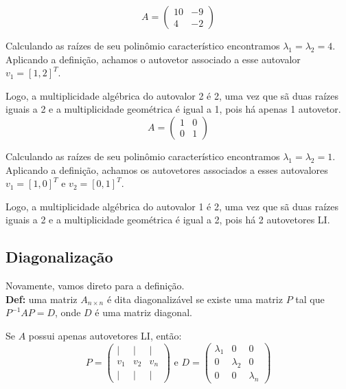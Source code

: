 \documentclass[12pt]{article}
\begin{document}
	\begin{equation*}
		A=\begin{pmatrix}
			10 & -9 \\
			4 & -2
		\end{pmatrix}	
	\end{equation*}
	
	Calculando as raízes de seu polinômio característico encontramos $\lambda_1=\lambda_2=4$. Aplicando a definição, achamos o autovetor associado a esse autovalor $v_1=[1,2]^T$. 
	
	Logo, a multiplicidade algébrica do autovalor 2 é 2, uma vez que sã duas raízes iguais a 2 e a multiplicidade geométrica é igual a 1, pois há apenas 1 autovetor.\\
	
	\begin{equation*}
		A=\begin{pmatrix}
			1 & 0 \\
			0 & 1
		\end{pmatrix}	
	\end{equation*}
	
	Calculando as raízes de seu polinômio característico encontramos $\lambda_1=\lambda_2=1$. Aplicando a definição, achamos os autovetores associados a esses autovalores $v_1=[1,0]^T$ e $v_2=[0,1]^T$. 
	
	Logo, a multiplicidade algébrica do autovalor 1 é 2, uma vez que sã duas raízes iguais a 2 e a multiplicidade geométrica é igual a 2, pois há 2 autovetores LI.
	
	\subsection{Diagonalização}
	
	Novamente, vamos direto para a definição.\\
	
	\textbf{Def:} uma matriz $A_{n\times n}$ é dita diagonalizável se existe uma matriz $P$ tal que $P^{-1}AP=D$, onde $D$ é uma matriz diagonal.
	
	Se $A$ possui apenas autovetores LI, então:
	\begin{equation*}
		P=\begin{pmatrix}
			| & | & |\\
			v_1 & v_2 & v_n\\
			| & | & |
		\end{pmatrix} \mbox{ e }
		D=\begin{pmatrix}
			\lambda_1 & 0 & 0 \\
			0 & \lambda_2 & 0 \\
			0 & 0 & \lambda_n
		\end{pmatrix}
	\end{equation*}
	
\end{document}
